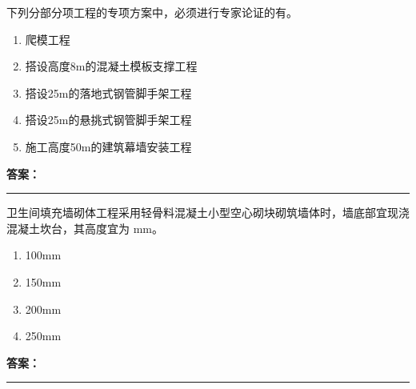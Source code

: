 \documentclass[UTF8,fontset=fandol,11pt]{ctexart}
\newcommand{\answerline}{\textcolor{answerred}{\rule{2.4cm}{0.7pt}}}
\begin{document}
\begin{quizbox}[title={乱序第 237 题｜第七章脚手架工程}]

下列分部分项工程的专项方案中，必须进行专家论证的有。\\

\begin{enumerate}[label=\Alph*.]

\item 爬模工程

\item 搭设高度8m的混凝土模板支撑工程

\item 搭设25m的落地式钢管脚手架工程

\item 搭设25m的悬挑式钢管脚手架工程

\item 施工高度50m的建筑幕墙安装工程

\end{enumerate}

\textbf{\textcolor{answerred}{答案：}} \answerline

\end{quizbox}

\vspace{0.2em}

\begin{quizbox}[title={乱序第 238 题｜第六章砌筑工程}]

卫生间填充墙砌体工程采用轻骨料混凝土小型空心砌块砌筑墙体时，墙底部宜现浇混凝土坎台，其高度宜为 mm。\\

\begin{enumerate}[label=\Alph*.]

\item 100mm

\item 150mm

\item 200mm

\item 250mm

\end{enumerate}

\textbf{\textcolor{answerred}{答案：}} \answerline

\end{quizbox}

\vspace{0.2em}
\end{document}
